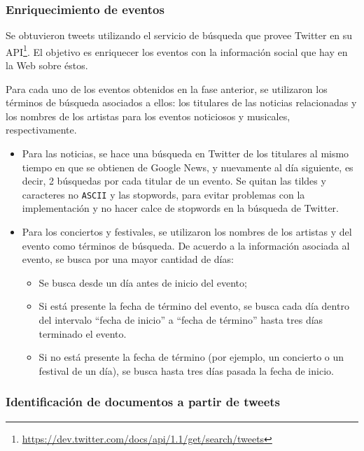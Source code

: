 \subsubsection{Enriquecimiento de eventos}

Se obtuvieron tweets utilizando el servicio de búsqueda que provee
Twitter en su
API\footnote{\href{https://dev.twitter.com/docs/api/1.1/get/search/tweets}{https://dev.twitter.com/docs/api/1.1/get/search/tweets} }. El
objetivo es enriquecer los eventos con la información social que hay
en la Web sobre éstos.

Para cada uno de los eventos obtenidos en la fase anterior, se
utilizaron los términos de búsqueda asociados a ellos: los titulares
de las noticias relacionadas y los nombres de los artistas para los
eventos noticiosos y musicales, respectivamente.

\begin{itemize}
\item Para las noticias, se hace una búsqueda en Twitter de los titulares
  al mismo tiempo en que se obtienen de Google News, y nuevamente al
  día siguiente, es decir, 2 búsquedas por cada titular de un evento.
  Se quitan las tildes y caracteres no \texttt{ASCII} y las stopwords, para
  evitar problemas con la implementación y no hacer calce de stopwords
  en la búsqueda de Twitter.
\item Para los conciertos y festivales, se utilizaron los nombres de los
  artistas y del evento como términos de búsqueda. De acuerdo a la
  información asociada al evento, se busca por una mayor cantidad de
  días:

\begin{itemize}
\item Se busca desde un día antes de inicio del evento;
\item Si está presente la fecha de término del evento, se busca cada día
    dentro del intervalo ``fecha de inicio'' a ``fecha de término'' hasta
    tres días terminado el evento.
\item Si no está presente la fecha de término (por ejemplo, un concierto
    o un festival de un día), se busca hasta tres días pasada la fecha
    de inicio.
\end{itemize}

\end{itemize}
\subsubsection{Identificación de documentos a partir de tweets}

